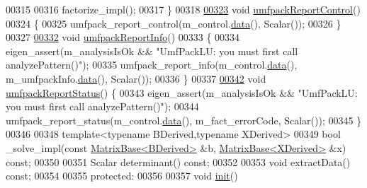 \begin{DoxyCode}
00315 
00316       factorize\_impl();
00317     \}
00318 
\hyperlink{class_eigen_1_1_umf_pack_l_u_ac6ff58ef8eb8221e6af87de750d6619b}{00323}     \textcolor{keywordtype}{void} \hyperlink{class_eigen_1_1_umf_pack_l_u_ac6ff58ef8eb8221e6af87de750d6619b}{umfpackReportControl}()
00324     \{
00325       umfpack\_report\_control(m\_control.\hyperlink{class_eigen_1_1_plain_object_base_ac25699535374b1854cf8494e44ad31b2}{data}(), Scalar());
00326     \}
00327 
\hyperlink{class_eigen_1_1_umf_pack_l_u_afad062dfc49ca6d2d19d534b3f8f8d28}{00332}     \textcolor{keywordtype}{void} \hyperlink{class_eigen_1_1_umf_pack_l_u_afad062dfc49ca6d2d19d534b3f8f8d28}{umfpackReportInfo}()
00333     \{
00334       eigen\_assert(m\_analysisIsOk && \textcolor{stringliteral}{"UmfPackLU: you must first call analyzePattern()"});
00335       umfpack\_report\_info(m\_control.\hyperlink{class_eigen_1_1_plain_object_base_ac25699535374b1854cf8494e44ad31b2}{data}(), m\_umfpackInfo.\hyperlink{class_eigen_1_1_plain_object_base_ac25699535374b1854cf8494e44ad31b2}{data}(), Scalar());
00336     \}
00337 
\hyperlink{class_eigen_1_1_umf_pack_l_u_a82497bbf75d995a6d4ae7e9191f79525}{00342}     \textcolor{keywordtype}{void} \hyperlink{class_eigen_1_1_umf_pack_l_u_a82497bbf75d995a6d4ae7e9191f79525}{umfpackReportStatus}() \{
00343       eigen\_assert(m\_analysisIsOk && \textcolor{stringliteral}{"UmfPackLU: you must first call analyzePattern()"});
00344       umfpack\_report\_status(m\_control.\hyperlink{class_eigen_1_1_plain_object_base_ac25699535374b1854cf8494e44ad31b2}{data}(), m\_fact\_errorCode, Scalar());
00345     \}
00346 
00348     \textcolor{keyword}{template}<\textcolor{keyword}{typename} BDerived,\textcolor{keyword}{typename} XDerived>
00349     \textcolor{keywordtype}{bool} \_solve\_impl(\textcolor{keyword}{const} \hyperlink{group___core___module_class_eigen_1_1_matrix_base}{MatrixBase<BDerived>} &b, 
      \hyperlink{group___core___module_class_eigen_1_1_matrix_base}{MatrixBase<XDerived>} &x) \textcolor{keyword}{const};
00350 
00351     Scalar determinant() \textcolor{keyword}{const};
00352 
00353     \textcolor{keywordtype}{void} extractData() \textcolor{keyword}{const};
00354 
00355   \textcolor{keyword}{protected}:
00356 
00357     \textcolor{keywordtype}{void} \hyperlink{structinit}{init}()

\end{DoxyCode}
